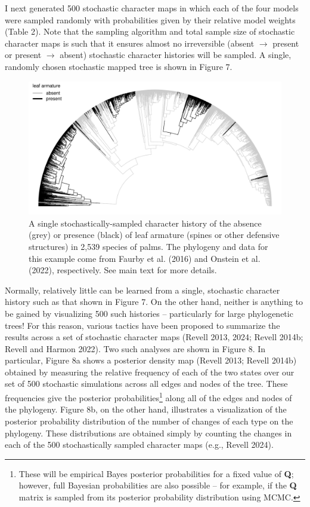 \documentclass{article}
\begin{document}
I next generated 500 stochastic character maps in which each of the four models were sampled randomly with probabilities given by their relative model weights (Table 2). Note that the sampling algorithm and total sample size of stochastic character maps is such that it ensures almost no irreversible (absent \(\rightarrow\) present or present \(\rightarrow\) absent) stochastic character histories will be sampled. A single, randomly chosen stochastic mapped tree is shown in Figure 7.

\begin{figure}
\includegraphics[width=1\linewidth]{Revell.AncestralReconstruction_files/figure-latex/fig7-1} \caption{A single stochastically-sampled character history of the absence (grey) or presence (black) of leaf armature (spines or other defensive structures) in 2,539 species of palms. The phylogeny and data for this example come from Faurby et al. (2016) and Onstein et al. (2022), respectively. See main text for more details.}\label{fig:fig7}
\end{figure}

Normally, relatively little can be learned from a single, stochastic character history such as that shown in Figure 7. On the other hand, neither is anything to be gained by visualizing 500 such histories -- particularly for large phylogenetic trees! For this reason, various tactics have been proposed to summarize the results across a set of stochastic character maps (Revell 2013, 2024; Revell 2014b; Revell and Harmon 2022). Two such analyses are shown in Figure 8. In particular, Figure 8a shows a posterior density map (Revell 2013; Revell 2014b) obtained by measuring the relative frequency of each of the two states over our set of 500 stochastic simulations across all edges and nodes of the tree. These frequencies give the posterior probabilities\footnote{These will be empirical Bayes posterior probabilities for a fixed value of \textbf{Q}; however, full Bayesian probabilities are also possible -- for example, if the \textbf{Q} matrix is sampled from its posterior probability distribution using MCMC.} along all of the edges and nodes of the phylogeny. Figure 8b, on the other hand, illustrates a visualization of the posterior probability distribution of the number of changes of each type on the phylogeny. These distributions are obtained simply by counting the changes in each of the 500 stochastically sampled character maps (e.g., Revell 2024).
\end{document}
